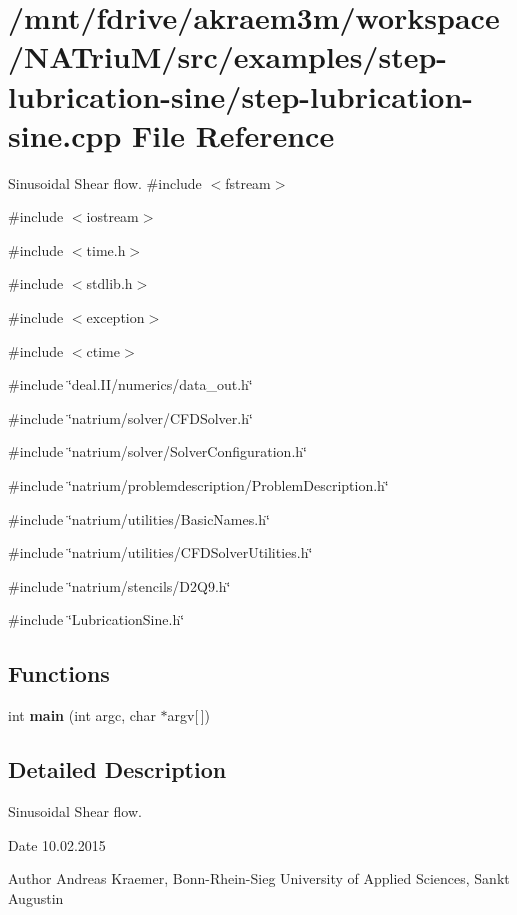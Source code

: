 \hypertarget{step-lubrication-sine_8cpp}{
\section{/mnt/fdrive/akraem3m/workspace/NATriuM/src/examples/step-\/lubrication-\/sine/step-\/lubrication-\/sine.cpp File Reference}
\label{step-lubrication-sine_8cpp}
}


Sinusoidal Shear flow.  
{\ttfamily \#include $<$fstream$>$}\par
{\ttfamily \#include $<$iostream$>$}\par
{\ttfamily \#include $<$time.h$>$}\par
{\ttfamily \#include $<$stdlib.h$>$}\par
{\ttfamily \#include $<$exception$>$}\par
{\ttfamily \#include $<$ctime$>$}\par
{\ttfamily \#include \char`\"{}deal.II/numerics/data\_\-out.h\char`\"{}}\par
{\ttfamily \#include \char`\"{}natrium/solver/CFDSolver.h\char`\"{}}\par
{\ttfamily \#include \char`\"{}natrium/solver/SolverConfiguration.h\char`\"{}}\par
{\ttfamily \#include \char`\"{}natrium/problemdescription/ProblemDescription.h\char`\"{}}\par
{\ttfamily \#include \char`\"{}natrium/utilities/BasicNames.h\char`\"{}}\par
{\ttfamily \#include \char`\"{}natrium/utilities/CFDSolverUtilities.h\char`\"{}}\par
{\ttfamily \#include \char`\"{}natrium/stencils/D2Q9.h\char`\"{}}\par
{\ttfamily \#include \char`\"{}LubricationSine.h\char`\"{}}\par
\subsection*{Functions}
\begin{DoxyCompactItemize}
\item 
\hypertarget{step-lubrication-sine_8cpp_a0ddf1224851353fc92bfbff6f499fa97}{
int {\bfseries main} (int argc, char $\ast$argv\mbox{[}$\,$\mbox{]})}
\label{step-lubrication-sine_8cpp_a0ddf1224851353fc92bfbff6f499fa97}

\end{DoxyCompactItemize}


\subsection{Detailed Description}
Sinusoidal Shear flow. \begin{DoxyDate}{Date}
10.02.2015 
\end{DoxyDate}
\begin{DoxyAuthor}{Author}
Andreas Kraemer, Bonn-\/Rhein-\/Sieg University of Applied Sciences, Sankt Augustin 
\end{DoxyAuthor}
